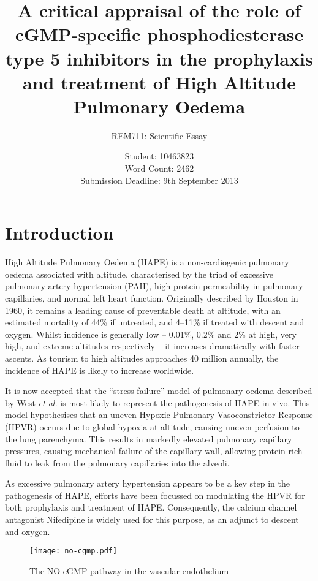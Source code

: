 \documentclass[12pt,a4paper]{article}
\title{A critical appraisal of the role of cGMP-specific phosphodiesterase type 5 inhibitors in the prophylaxis and treatment of High Altitude Pulmonary Oedema}
\author{REM711: Scientific Essay}
\date{Student: 10463823 \\ Word Count: 2462 \\ Submission Deadline: 9th September 2013}
\begin{document}
\maketitle


\section*{Introduction}

High Altitude Pulmonary Oedema (HAPE) is a non-cardiogenic pulmonary oedema associated with altitude, characterised by the triad of excessive pulmonary artery hypertension (PAH), high protein permeability in pulmonary capillaries, and normal left heart function.\cite{Fred:1962hy,Roy:1969tt,Schoene:1988tz} Originally described by Houston in 1960, it remains a leading cause of preventable death at altitude, with an estimated mortality of 44\% if untreated, and 4--11\% if treated with descent and oxygen.\cite{HOUSTON:1960gz,Lobenhoffer:1982eg,MENON:1965gk} Whilst incidence is generally low -- 0.01\%, 0.2\% and 2\% at high, very high, and extreme altitudes respectively -- it increases dramatically with faster ascents.\cite{Bartsch:2002cg} As tourism to high altitudes approaches 40 million annually, the incidence of HAPE is likely to increase worldwide.\cite{West:ug}

It is now accepted that the ``stress failure'' model of pulmonary oedema described by West \emph{et al.} is most likely to represent the pathogenesis of HAPE in-vivo.\cite{Maggiorini:2001vq} This model hypothesises that an uneven Hypoxic Pulmonary Vasoconstrictor Response (HPVR) occurs due to global hypoxia at altitude, causing uneven perfusion to the lung parenchyma. This results in markedly elevated pulmonary capillary pressures, causing mechanical failure of the capillary wall, allowing protein-rich fluid to leak from the pulmonary capillaries into the alveoli.\cite{West:1991vc,West:1995tg}

As excessive pulmonary artery hypertension appears to be a key step in the pathogenesis of HAPE,\cite{Maggiorini:2001vq,Swenson:2002ub} efforts have been focussed on modulating the HPVR for both prophylaxis and treatment of HAPE. Consequently, the calcium channel antagonist Nifedipine is widely used for this purpose, as an adjunct to descent and oxygen.\cite{Luks:2010ht}

\begin{figure}[!hb]
\centering
\texttt{[image: no-cgmp.pdf]}
\caption{The NO-cGMP pathway in the vascular endothelium\cite{Archer:2009cx}}
\label{fig:no-cgmp_pathway}
\end{figure}
\end{document}
